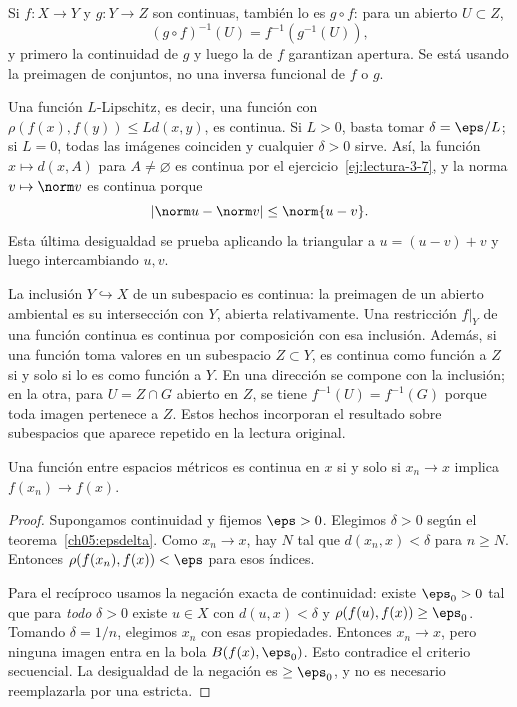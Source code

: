 Si $f:X\to Y$ y $g:Y\to Z$ son continuas, también lo es $g\circ f$: para un abierto $U\subset Z$,
\[
(g\circ f)^{-1}(U)=f^{-1}(g^{-1}(U)),
\]
y primero la continuidad de $g$ y luego la de $f$ garantizan apertura. Se está usando la preimagen de conjuntos, no una inversa funcional de $f$ o $g$.

Una función $L$-Lipschitz, es decir, una función con $\rho(f(x),f(y))\le Ld(x,y)$, es continua. Si $L>0$, basta tomar $\delta=\eps/L$; si $L=0$, todas las imágenes coinciden y cualquier $\delta>0$ sirve. Así, la función $x\mapsto d(x,A)$ para $A\ne\varnothing$ es continua por el ejercicio~\ref{ej:lectura-3-7}, y la norma $v\mapsto\norm v$ es continua porque
\[
|\norm u-\norm v|\le\norm{u-v}.
\]
Esta última desigualdad se prueba aplicando la triangular a $u=(u-v)+v$ y luego intercambiando $u,v$.

La inclusión $Y\hookrightarrow X$ de un subespacio es continua: la preimagen de un abierto ambiental es su intersección con $Y$, abierta relativamente. Una restricción $f|_Y$ de una función continua es continua por composición con esa inclusión. Además, si una función toma valores en un subespacio $Z\subset Y$, es continua como función a $Z$ si y solo si lo es como función a $Y$. En una dirección se compone con la inclusión; en la otra, para $U=Z\cap G$ abierto en $Z$, se tiene $f^{-1}(U)=f^{-1}(G)$ porque toda imagen pertenece a $Z$. Estos hechos incorporan el resultado sobre subespacios que aparece repetido en la lectura original.

\begin{teorema}\label{ch05:secuencial}
Una función entre espacios métricos es continua en $x$ si y solo si $x_n\to x$ implica $f(x_n)\to f(x)$.
\end{teorema}
\begin{proof}
Supongamos continuidad y fijemos $\eps>0$. Elegimos $\delta>0$ según el teorema~\ref{ch05:epsdelta}. Como $x_n\to x$, hay $N$ tal que $d(x_n,x)<\delta$ para $n\ge N$. Entonces $\rho(f(x_n),f(x))<\eps$ para esos índices.

Para el recíproco usamos la negación exacta de continuidad: existe $\eps_0>0$ tal que para \emph{todo} $\delta>0$ existe $u\in X$ con $d(u,x)<\delta$ y $\rho(f(u),f(x))\ge\eps_0$. Tomando $\delta=1/n$, elegimos $x_n$ con esas propiedades. Entonces $x_n\to x$, pero ninguna imagen entra en la bola $B(f(x),\eps_0)$. Esto contradice el criterio secuencial. La desigualdad de la negación es $\ge\eps_0$, y no es necesario reemplazarla por una estricta.
\end{proof}

